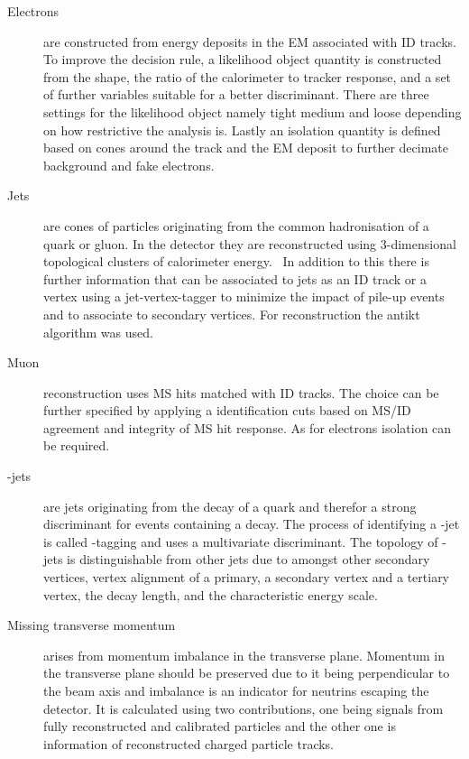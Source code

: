 \begin{description}
\item[Electrons] 
are constructed from energy deposits in the EM associated with ID tracks.
To improve the decision rule, a likelihood object quantity is constructed from the shape, the ratio of the calorimeter to tracker response, and a set of further variables suitable for a better discriminant. There are three settings for the likelihood object namely tight medium and loose depending on how restrictive the analysis is.
Lastly an isolation quantity is defined based on cones around the track and the EM deposit to further decimate background and fake electrons.~\cite{ATLAS-CONF-2016-024}
\item[Jets] are cones of particles originating from the common hadronisation of a quark or gluon. In the detector they are reconstructed using 3-dimensional topological clusters of calorimeter energy.~\cite{Aad:2016upy} In addition to this there is further information that can be associated to jets as an ID track or a vertex using a jet-vertex-tagger to minimize the impact of pile-up events and to associate to secondary vertices. For reconstruction the  antikt algorithm was used.~\cite{Cacciari:2008gp}
\item[Muon] reconstruction uses MS hits matched with ID tracks. The choice can be further specified by applying a identification cuts based on MS/ID agreement and integrity of MS hit response. As for electrons isolation can be required.~\cite{Aad:2016jkr}
\item[\Pbottom-jets] are jets originating from the decay of a \Pbottom quark and therefor a strong discriminant for events containing a \Ptop decay. The process of identifying a \Pbottom-jet is called \Pbottom-tagging and uses a multivariate discriminant. The topology of \Pbottom-jets is distinguishable from other jets due to amongst other secondary vertices, vertex alignment of a primary, a secondary \Pbottom vertex and a tertiary \Pcharm vertex, the decay length, and the characteristic energy scale.~\cite{Aad:2110203, ATL-PHYS-PUB-2016-012}
\item[Missing transverse momentum]
arises from momentum imbalance in the transverse plane. Momentum in the transverse plane should be preserved due to it being perpendicular to the beam axis and imbalance is an indicator for neutrins escaping the detector. It is calculated using two contributions, one being signals from fully reconstructed and calibrated particles and the other one is information of reconstructed charged particle tracks. ~\cite{Aaboud:2018tkc}  
\end{description}


